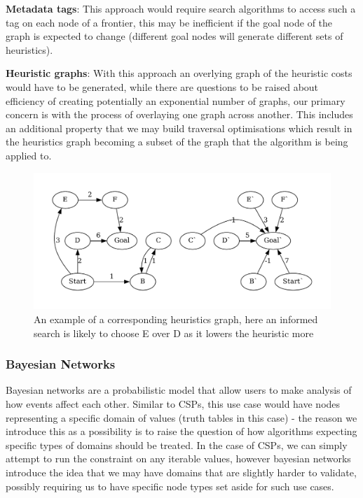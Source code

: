 \textbf{Metadata tags}: This approach would require search algorithms to access such a tag on each node of a frontier,
this may be inefficient if the goal node of the graph is expected to change (different goal nodes will generate
different sets of heuristics).

\textbf{Heuristic graphs}: With this approach an overlying graph of the heuristic costs would have to be generated,
while there are questions to be raised about efficiency of creating potentially an exponential number of graphs, our
primary concern is with the process of overlaying one graph across another.
This includes an additional property that we may build traversal optimisations which result in the heuristics graph
becoming a subset of the graph that the algorithm is being applied to.

\begin{figure}[H]
    \centering
    \includegraphics[width=12cm]{figures/example_graphs/informed_pathfinding.gv}
    \caption{An example of a corresponding heuristics graph, here an informed search is likely to choose E over D as it lowers the heuristic more}
    \label{fig:example_heuristic_graph}
\end{figure}

\subsubsection{Bayesian Networks}
Bayesian networks are a probabilistic model that allow users to make analysis of how events affect each other.
Similar to CSPs, this use case would have nodes representing a specific domain of values (truth tables in this case) -
the reason we introduce this as a possibility is to raise the question of how algorithms expecting specific types of
domains should be treated.
In the case of CSPs, we can simply attempt to run the constraint on any iterable values, however bayesian networks
introduce the idea that we may have domains that are slightly harder to validate, possibly requiring us to have
specific node types set aside for such use cases.

